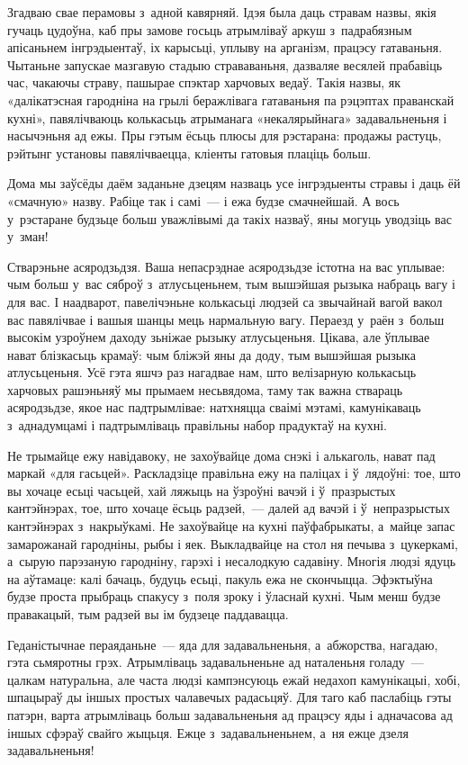 Згадваю свае перамовы з~адной кавярняй. Ідэя была даць стравам назвы, якія гучаць цудоўна, каб пры замове госьць атрымліваў аркуш з~падрабязным апісаньнем інгрэдыентаў, іх карысьці, уплыву на арганізм, працэсу гатаваньня. Чытаньне запускае мазгавую стадыю страваваньня, дазваляе весялей прабавіць час, чакаючы страву, пашырае спэктар харчовых ведаў. Такія назвы, як «далікатэсная гародніна на грылі беражлівага гатаваньня па рэцэптах праванскай кухні», павялічваюць колькасьць атрыманага «некалярыйнага» задавальненьня і насычэньня ад ежы. Пры гэтым ёсьць плюсы для рэстарана: продажы растуць, рэйтынг установы павялічваецца, кліенты гатовыя плаціць больш.

Дома мы заўсёды даём заданьне дзецям назваць усе інгрэдыенты стравы і даць ёй «смачную» назву. Рабіце так і самі~--- і ежа будзе смачнейшай. А вось у~рэстаране будзьце больш уважлівымі да такіх назваў, яны могуць уводзіць вас у~зман!

Стварэньне асяродзьдзя. Ваша непасрэднае асяродзьдзе істотна на вас уплывае: чым больш у~вас сяброў з~атлусьценьнем, тым вышэйшая рызыка набраць вагу і для вас. І наадварот, павелічэньне колькасьці людзей са звычайнай вагой вакол вас павялічвае і вашыя шанцы мець нармальную вагу. Пераезд у~раён з~больш высокім узроўнем даходу зьніжае рызыку атлусьценьня. Цікава, але ўплывае нават блізкасьць крамаў: чым бліжэй яны да доду, тым вышэйшая рызыка атлусьценьня. Усё гэта яшчэ раз нагадвае нам, што велізарную колькасьць харчовых рашэньняў мы прымаем несьвядома, таму так важна ствараць асяродзьдзе, якое нас падтрымлівае: натхняцца сваімі мэтамі, камунікаваць з~аднадумцамі і падтрымліваць правільны набор прадуктаў на кухні.

Не трымайце ежу навідавоку, не захоўвайце дома снэкі і алькаголь, нават пад маркай «для гасьцей». Раскладзіце правільна ежу на паліцах і ў~лядоўні: тое, што вы хочаце есьці часьцей, хай ляжыць на ўзроўні вачэй і ў~празрыстых кантэйнэрах, тое, што хочаце ёсьць радзей,~--- далей ад вачэй і ў~непразрыстых кантэйнэрах з~накрыўкамі. Не захоўвайце на кухні паўфабрыкаты, а~майце запас замарожанай гародніны, рыбы і яек. Выкладвайце на стол ня печыва з~цукеркамі, а~сырую парэзаную гародніну, гарэхі і несалодкую садавіну. Многія людзі ядуць на аўтамаце: калі бачаць, будуць есьці, пакуль ежа не скончыцца. Эфэктыўна будзе проста прыбраць спакусу з~поля зроку і ўласнай кухні. Чым менш будзе правакацый, тым радзей вы ім будзеце паддавацца.

Геданістычнае пераяданьне~--- яда для задавальненьня, а~абжорства, нагадаю, гэта сьмяротны грэх. Атрымліваць задавальненьне ад наталеньня голаду~--- цалкам натуральна, але часта людзі кампэнсуюць ежай недахоп камунікацыі, хобі, шпацыраў ды іншых простых чалавечых радасьцяў. Для таго каб паслабіць гэты патэрн, варта атрымліваць больш задавальненьня ад працэсу яды і адначасова ад іншых сфэраў свайго жыцьця. Ежце з~задавальненьнем, а~ня ежце дзеля задавальненьня!

